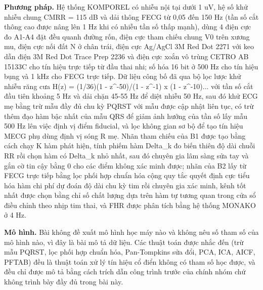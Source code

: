 \documentclass[12pt,a4paper]{article}
\begin{document}
\noindent \textbf{Phương pháp.} Hệ thống KOMPOREL có nhiễu nội tại dưới 1 uV, hệ số khử nhiễu chung CMRR = 115 dB và dải thông FECG từ 0,05 đến 150 Hz (tần số cắt thông cao được nâng lên 1 Hz khi có nhiễu tần số thấp mạnh), dùng 4 điện cực đo A1-A4 đặt đều quanh đường rốn, điện cực tham chiếu chung V0 trên xương mu, điện cực nối đất N ở chân trái, điện cực Ag/AgCl 3M Red Dot 2271 với keo dẫn điện 3M Red Dot Trace Prep 2236 và điện cực xoắn vô trùng CETRO AB 15133C cho tín hiệu trực tiếp từ đầu thai nhi; số hóa 16 bit ở 500 Hz cho tín hiệu bụng và 1 kHz cho FECG trực tiếp. Dữ liệu công bố đã qua bộ lọc lược khử nhiễu răng cưa H(z) = (1/36)(1 - z\textasciicircum{}-50)/(1 - z\textasciicircum{}-1) x (1 - z\textasciicircum{}-10)... với tần số cắt đầu tiên khoảng 5 Hz và dải chặn 45-55 Hz để diệt nhiễu 50 Hz, sau đó khử ECG mẹ bằng trừ mẫu đầy đủ chu kỳ PQRST với mẫu được cập nhật liên tục, có trừ thêm đạo hàm bậc nhất của mẫu QRS để giảm ảnh hưởng của tần số lấy mẫu 500 Hz lên việc định vị điểm fiducial, và lọc không gian sơ bộ để tạo tín hiệu MECG phụ dùng định vị sóng R mẹ. Nhãn tham chiếu của B1 được tạo bằng cách chạy K hàm phát hiện, tính phiếm hàm Delta\_k đo biến thiên độ dài chuỗi RR rồi chọn hàm có Delta\_k nhỏ nhất, sau đó chuyên gia lâm sàng sửa tay và gắn cờ tin cậy bằng 0 cho các điểm không xác minh được; nhãn của B2 lấy từ FECG trực tiếp bằng lọc phối hợp chuẩn hóa cộng quy tắc quyết định cực tiểu hóa hàm chi phí dự đoán độ dài chu kỳ tim rồi chuyên gia xác minh, kênh tốt nhất được chọn bằng chỉ số chất lượng dựa trên hàm tự tương quan trong cửa sổ điều chỉnh theo nhịp tim thai, và FHR được phân tích bằng hệ thống MONAKO ở 4 Hz.\par\vspace{3pt}
\noindent \textbf{Mô hình.} Bài không đề xuất mô hình học máy nào và không nêu số tham số của mô hình nào, vì đây là bài mô tả dữ liệu. Các thuật toán được nhắc đến (trừ mẫu PQRST, lọc phối hợp chuẩn hóa, Pan-Tompkins sửa đổi, PCA, ICA, AICF, PFTAB) đều là thuật toán xử lý tín hiệu cổ điển không có tham số học được, và đều chỉ được mô tả bằng cách trích dẫn công trình trước của chính nhóm chứ không trình bày đầy đủ trong bài này.\par\vspace{3pt}
\end{document}
